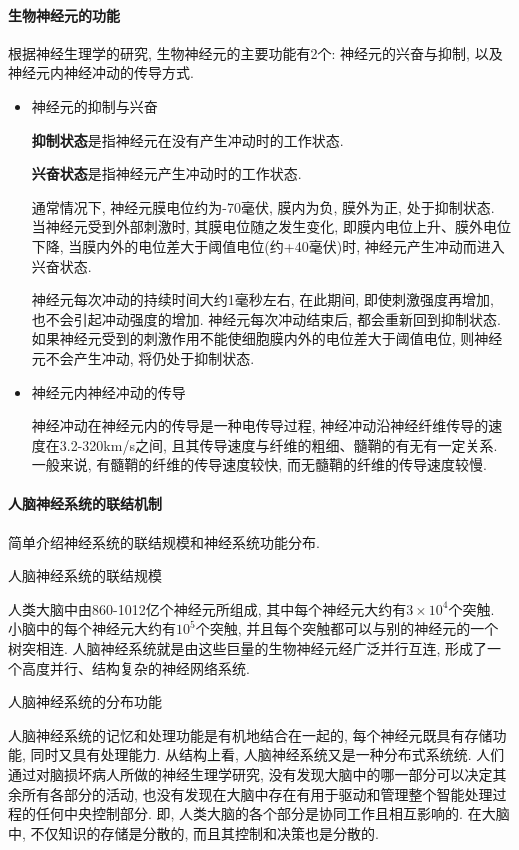 \paragraph{生物神经元的功能}
根据神经生理学的研究, 生物神经元的主要功能有2个: 神经元的兴奋与抑制, 以及神经元内神经冲动的传导方式.
\begin{itemize}
\item {} 神经元的抑制与兴奋

\textbf{抑制状态}是指神经元在没有产生冲动时的工作状态.

\textbf{兴奋状态}是指神经元产生冲动时的工作状态.

通常情况下, 神经元膜电位约为-70毫伏, 膜内为负, 膜外为正, 处于抑制状态. 当神经元受到外部刺激时, 其膜电位随之发生变化, 即膜内电位上升、膜外电位下降, 当膜内外的电位差大于阈值电位(约+40毫伏)时, 神经元产生冲动而进入兴奋状态.

\begin{remark}
    神经元每次冲动的持续时间大约1毫秒左右, 在此期间, 即使刺激强度再增加, 也不会引起冲动强度的增加. 神经元每次冲动结束后, 都会重新回到抑制状态. 如果神经元受到的刺激作用不能使细胞膜内外的电位差大于阈值电位, 则神经元不会产生冲动, 将仍处于抑制状态.
\end{remark}

\item {} 神经元内神经冲动的传导

神经冲动在神经元内的传导是一种电传导过程, 神经冲动沿神经纤维传导的速度在3.2-320\si{km/s}之间, 且其传导速度与纤维的粗细、髓鞘的有无有一定关系. 一般来说, 有髓鞘的纤维的传导速度较快, 而无髓鞘的纤维的传导速度较慢.
\end{itemize}
\paragraph{人脑神经系统的联结机制} 简单介绍神经系统的联结规模和神经系统功能分布.

 人脑神经系统的联结规模

人类大脑中由860-1012亿个神经元所组成, 其中每个神经元大约有$3\times 10^4$个突触. 小脑中的每个神经元大约有$10^5$个突触, 并且每个突触都可以与别的神经元的一个树突相连. 人脑神经系统就是由这些巨量的生物神经元经广泛并行互连, 形成了一个高度并行、结构复杂的神经网络系统.

 人脑神经系统的分布功能

人脑神经系统的记忆和处理功能是有机地结合在一起的, 每个神经元既具有存储功能, 同时又具有处理能力. 从结构上看, 人脑神经系统又是一种分布式系统统.
人们通过对脑损坏病人所做的神经生理学研究, 没有发现大脑中的哪一部分可以决定其余所有各部分的活动, 也没有发现在大脑中存在有用于驱动和管理整个智能处理过程的任何中央控制部分.
即, 人类大脑的各个部分是协同工作且相互影响的. 在大脑中, 不仅知识的存储是分散的, 而且其控制和决策也是分散的.
